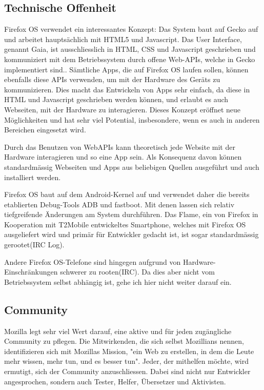 \subsection{Technische Offenheit}
Firefox OS verwendet ein interessantes Konzept: Das System baut auf Gecko auf und arbeitet hauptsächlich mit HTML5 und Javascript. Das User Interface, genannt Gaia, ist ausschliesslich in HTML, CSS und Javascript geschrieben und kommuniziert mit dem Betriebssystem durch offene Web-APIs, welche in Gecko implementiert sind.\cite{online:ff-gaia}. Sämtliche Apps, die auf Firefox OS laufen sollen, können ebenfalls diese APIs verwenden, um mit der Hardware des Geräts zu kommunizieren\cite{online:ff-webapi}. Dies macht das Entwickeln von Apps sehr einfach, da diese in HTML und Javascript geschrieben werden können\cite{online:ff-apps}, und erlaubt es auch Webseiten, mit der Hardware zu interagieren. Dieses Konzept eröffnet neue Möglichkeiten und hat sehr viel Potential, insbesondere, wenn es auch in anderen Bereichen eingesetzt wird.

Durch das Benutzen von WebAPIs kann theoretisch jede Website mit der Hardware interagieren und so eine App sein. Als Konsequenz davon können standardmässig Webseiten und Apps aus beliebigen Quellen ausgeführt und auch installiert werden. 


Firefox OS baut auf dem Android-Kernel auf und verwendet daher die bereits etablierten Debug-Tools ADB und fastboot\cite{online:ff-fastboot}. Mit denen lassen sich relativ tiefgreifende Änderungen am System durchführen. Das Flame, ein von Firefox in Kooperation mit T2Mobile entwickeltes Smartphone, welches mit Firefox OS ausgeliefert wird und primär für Entwickler gedacht ist\cite{online:ff-flame}, ist sogar standardmässig gerootet(IRC Log).

Andere Firefox OS-Telefone sind hingegen aufgrund von Hardware-Einschränkungen schwerer zu rooten(IRC). Da dies aber nicht vom Betriebssystem selbst abhängig ist, gehe ich hier nicht weiter darauf ein.\\


\subsection{Community}
Mozilla legt sehr viel Wert darauf, eine aktive und für jeden zugängliche Community zu pflegen\cite{online:mozilla-volunteer}. Die Mitwirkenden, die sich selbst Mozillians nennen, identifizieren sich mit Mozillas Mission, "ein Web zu erstellen, in dem die Leute mehr wissen, mehr tun, und es besser tun"\cite{online:mozilla-community}. 
Jeder, der mithelfen möchte, wird ermutigt, sich der Community anzuschliessen. Dabei sind nicht nur Entwickler angesprochen, sondern auch Tester, Helfer, Übersetzer und Aktivisten\cite{online:mozilla-get-involved}. 

